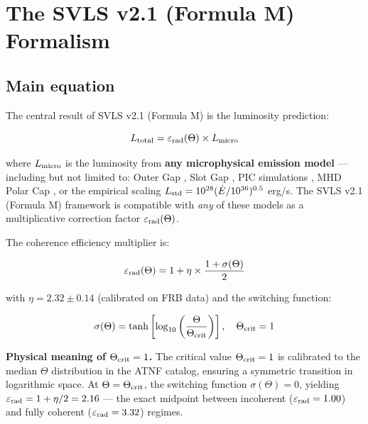 \documentclass[10pt,twocolumn]{article}
\begin{document}
\section{The SVLS v2.1 (Formula M) Formalism}

\subsection{Main equation}

The central result of SVLS v2.1 (Formula M) is the luminosity prediction:

\begin{equation}
L_{\rm total} = \varepsilon_{\rm rad}(\Theta) \times L_{\rm micro}
\label{eq:main}
\end{equation}

where $L_{\rm micro}$ is the luminosity from \textbf{any microphysical emission model} --- including but not limited to: Outer Gap \citep{Cheng1986}, Slot Gap \citep{Muslimov2004}, PIC simulations \citep{Chen2020}, MHD Polar Cap \citep{Timokhin2010}, or the empirical scaling $L_{\rm std} = 10^{28}(\dot{E}/10^{36})^{0.5}$ erg/s. The SVLS v2.1 (Formula M) framework is compatible with \textit{any} of these models as a multiplicative correction factor $\varepsilon_{\rm rad}(\Theta)$.

The coherence efficiency multiplier is:

\begin{equation}
\varepsilon_{\rm rad}(\Theta) = 1 + \eta \times \frac{1 + \sigma(\Theta)}{2}
\label{eq:eps}
\end{equation}

with $\eta = 2.32 \pm 0.14$ (calibrated on FRB data) and the switching function:

\begin{equation}
\sigma(\Theta) = \tanh\left[\log_{10}\left(\frac{\Theta}{\Theta_{\rm crit}}\right)\right], \quad \Theta_{\rm crit} = 1
\label{eq:sigma}
\end{equation}

\textbf{Physical meaning of $\Theta_{\rm crit} = 1$.} The critical value $\Theta_{\rm crit} = 1$ is calibrated to the median $\Theta$ distribution in the ATNF catalog, ensuring a symmetric transition in logarithmic space. At $\Theta = \Theta_{\rm crit}$, the switching function $\sigma(\Theta) = 0$, yielding $\varepsilon_{\rm rad} = 1 + \eta/2 = 2.16$ --- the exact midpoint between incoherent ($\varepsilon_{\rm rad} = 1.00$) and fully coherent ($\varepsilon_{\rm rad} = 3.32$) regimes.
\end{document}
